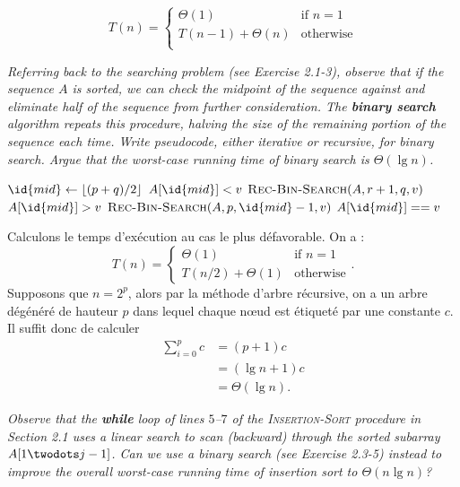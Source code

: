 \begin{description}
\begin{ex}
  \[T(n) = \left\{
    \begin{array}{ll}
    \Theta(1) & \text {if } n = 1\\
      T(n-1) + \Theta(n) & \text{otherwise}\\ 
    \end{array}
  \right.\]
\end{ex}

 {\itshape Referring back to the searching problem (see Exercise 2.1-3), observe that if the sequence $A$ is sorted, we can check the midpoint of the sequence against and eliminate half of the sequence from further consideration. The {\bfseries binary search} algorithm repeats this procedure, halving the size of the remaining portion of the sequence each time. Write pseudocode, either iterative or recursive, for binary
  search. Argue that the worst-case running time of binary search is $\Theta (\lg n)$.}
  \begin{ex}
    \begin{codebox}
      \li $\id{mid} \gets \lfloor(p+q)/2\rfloor$
      \li \If $A[\id{mid}] < v$ \Then
      \li $\textsc{Rec-Bin-Search}(A, r+1, q, v)$ \End
      \li \Else \If $A[\id{mid}] > v$ \Then
      \li  $\textsc{Rec-Bin-Search}(A, p, \id{mid}-1, v)$ \End
      \li \Else \If $A[\id{mid}]  == v$ \Then
      \li \Return {}
      \li \Else 
      \li \Return {} \End
    \end{codebox}

    Calculons le temps d'ex\'ecution au cas le plus d\'efavorable. On a :
    \[T(n) = \left\{ 
      \begin{array}{ll}
        \Theta(1) & \text{if } n = 1\\
        T(n/2) + \Theta(1) & \text{otherwise}
      \end{array}
    \right..\]
    Supposons que $n = 2^p$, alors par la m\'ethode d'arbre r\'ecursive, on a un arbre d\'eg\'en\'er\'e de hauteur $p$ dans lequel chaque n\oe ud est \'etiquet\'e par une constante $c$. Il suffit donc de calculer 
    \begin{align*}
      \sum_{i=0}^{p}c &= (p+1)c\\
     &= (\lg n + 1)c\\
     &= \Theta(\lg n).
    \end{align*}
  \end{ex}

 {\itshape Observe that the {\bfseries while} loop of lines $5$–$7$ of the {\scshape Insertion-Sort} procedure in Section 2.1 uses a linear search to scan (backward) through the sorted subarray $A[1 \twodots j-1]$. Can we use a binary search (see Exercise 2.3-5) instead to improve the overall worst-case running time of insertion sort to $\Theta(n \lg n)$?}


\end{description}
